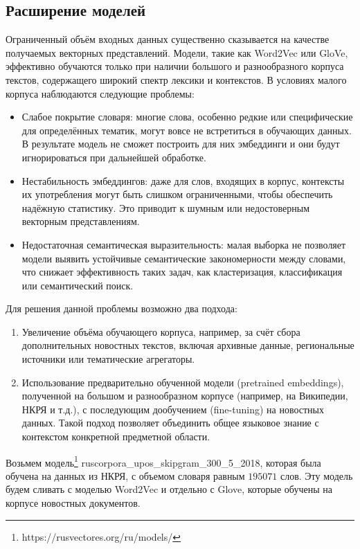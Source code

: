 \documentclass[coursework]{SCWorks}
\begin{document}
\subsection{Расширение моделей}
Ограниченный объём входных данных существенно сказывается на качестве получаемых векторных представлений. Модели, такие как Word2Vec или GloVe, эффективно обучаются только при наличии большого и разнообразного корпуса текстов, содержащего широкий спектр лексики и контекстов. В условиях малого корпуса наблюдаются следующие проблемы:
\begin{itemize}
    \item Слабое покрытие словаря: многие слова, особенно редкие или специфические для определённых тематик, могут вовсе не встретиться в обучающих данных. В результате модель не сможет построить для них эмбеддинги и они будут игнорироваться при дальнейшей обработке.

    \item Нестабильность эмбеддингов: даже для слов, входящих в корпус, контексты их употребления могут быть слишком ограниченными, чтобы обеспечить надёжную статистику. Это приводит к шумным или недостоверным векторным представлениям.

    \item Недостаточная семантическая выразительность: малая выборка не позволяет модели выявить устойчивые семантические закономерности между словами, что снижает эффективность таких задач, как кластеризация, классификация или семантический поиск.
\end{itemize}


Для решения данной проблемы возможно два подхода:
\begin{enumerate}
    \item Увеличение объёма обучающего корпуса, например, за счёт сбора дополнительных новостных текстов, включая архивные данные, региональные источники или тематические агрегаторы.
    
    \item Использование предварительно обученной модели (pretrained embeddings), полученной на большом и разнообразном корпусе (например, на Википедии, НКРЯ и т.д.), с последующим дообучением (fine-tuning) на новостных данных. Такой подход позволяет объединить общее языковое знание с контекстом конкретной предметной области.
\end{enumerate}
    
Возьмем модель\footnote{https://rusvectores.org/ru/models/} ruscorpora\_upos\_skipgram\_300\_5\_2018, которая была обучена на данных из НКРЯ, с объемом словаря равным $195 071$ слов. Эту модель будем сливать с моделью Word2Vec и отдельно с Glove, которые обучены на корпусе новостных документов.
\end{document}

